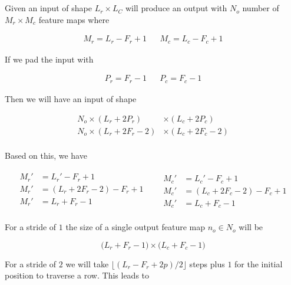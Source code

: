 \documentclass[12pt]{article}
\begin{document}
\section{}

Given an input of shape $L_r \times L_C$ will produce an output with
$N_o$ number of $M_r \times M_c$ feature maps where

\begin{align}
	M_r = L_r - F_r + 1 && M_c = L_c - F_c + 1
\end{align}

If we pad the input with

\begin{align}
	P_r = F_r - 1 && P_c = F_c - 1
\end{align}

Then we will have an input of shape

\begin{align}
	N_o \times (L_r + 2 P_r) \phantom{-2} &\times (L_c + 2 P_c)\\
	N_o \times (L_r + 2 F_r - 2) &\times (L_c + 2 F_c - 2)\\
\end{align}

Based on this, we have

\begin{align}
	\begin{aligned}
		M_r' &= L_r' - F_r + 1 \\
		M_r' &= (L_r+2F_r-2) - F_r + 1\\
		M_r' &= L_r+F_r - 1 \\
	\end{aligned}
	&&
	\begin{aligned}
		M_c' &= L_c' - F_c + 1 \\
		M_c' &= (L_c+2F_c-2) - F_c + 1 \\
		M_c' &= L_c+F_c - 1
	\end{aligned}
\end{align}

For a stride of $1$ the size of a single output feature map $n_o \in N_o$ will
be

\begin{equation}
	\big(L_r+F_r-1\big)\times\big(L_c+F_c-1\big)
\end{equation}

For a stride of $2$ we will take $\lfloor (L_r - F_r + 2p)/2 \rfloor$ steps plus $1$ for
the initial position to traverse a row. This leads to

\begin{align}
\end{align}
\end{document}
